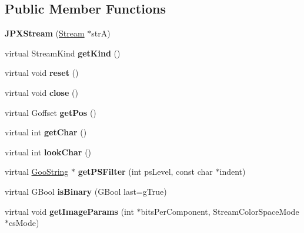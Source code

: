 \subsection*{Public Member Functions}
\begin{DoxyCompactItemize}
\item 
\mbox{\label{class_j_p_x_stream_a93934e2b6491d3ac74fd63ff3b7f0a9d}} 
{\bfseries J\+P\+X\+Stream} (\hyperlink{class_stream}{Stream} $\ast$strA)
\item 
\mbox{\label{class_j_p_x_stream_a6346ad3c5698a8779202da452db08ac0}} 
virtual Stream\+Kind {\bfseries get\+Kind} ()
\item 
\mbox{\label{class_j_p_x_stream_ac98b7ff342ea4416426936d7e29bc6c9}} 
virtual void {\bfseries reset} ()
\item 
\mbox{\label{class_j_p_x_stream_aed609696b3df82ad9f6d9b7caf79f0b6}} 
virtual void {\bfseries close} ()
\item 
\mbox{\label{class_j_p_x_stream_a3c662196294f19a91964259b9c910439}} 
virtual Goffset {\bfseries get\+Pos} ()
\item 
\mbox{\label{class_j_p_x_stream_aacaf82e6eb0b5855224e8d38ef11acc6}} 
virtual int {\bfseries get\+Char} ()
\item 
\mbox{\label{class_j_p_x_stream_a7d45dac303525b55e72b7527095cc277}} 
virtual int {\bfseries look\+Char} ()
\item 
\mbox{\label{class_j_p_x_stream_a9ab2b571ce633843cf4dacd4361666c2}} 
virtual \hyperlink{class_goo_string}{Goo\+String} $\ast$ {\bfseries get\+P\+S\+Filter} (int ps\+Level, const char $\ast$indent)
\item 
\mbox{\label{class_j_p_x_stream_adf6cb7604292479d561d90d723699c05}} 
virtual G\+Bool {\bfseries is\+Binary} (G\+Bool last=g\+True)
\item 
\mbox{\label{class_j_p_x_stream_aa984282e804fee14659cecea5c66eb93}} 
virtual void {\bfseries get\+Image\+Params} (int $\ast$bits\+Per\+Component, Stream\+Color\+Space\+Mode $\ast$cs\+Mode)

\end{DoxyCompactItemize}
